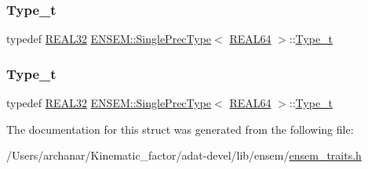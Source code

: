 \mbox{\label{structENSEM_1_1SinglePrecType_3_01REAL64_01_4_a931deb5906e330bffb27804fd850d061}} 
\subsubsection{\texorpdfstring{Type\_t}{Type\_t}\hspace{0.1cm}{\footnotesize\ttfamily [2/3]}}
{\footnotesize\ttfamily typedef \mbox{\hyperlink{namespaceENSEM_a7540d01191172323e9073283d772576d}{R\+E\+A\+L32}} \mbox{\hyperlink{structENSEM_1_1SinglePrecType}{E\+N\+S\+E\+M\+::\+Single\+Prec\+Type}}$<$ \mbox{\hyperlink{namespaceENSEM_a85b215b9f1f43715aebee01718e25082}{R\+E\+A\+L64}} $>$\+::\mbox{\hyperlink{structENSEM_1_1SinglePrecType_3_01REAL64_01_4_a931deb5906e330bffb27804fd850d061}{Type\+\_\+t}}}

\mbox{\label{structENSEM_1_1SinglePrecType_3_01REAL64_01_4_a931deb5906e330bffb27804fd850d061}} 
\subsubsection{\texorpdfstring{Type\_t}{Type\_t}\hspace{0.1cm}{\footnotesize\ttfamily [3/3]}}
{\footnotesize\ttfamily typedef \mbox{\hyperlink{namespaceENSEM_a7540d01191172323e9073283d772576d}{R\+E\+A\+L32}} \mbox{\hyperlink{structENSEM_1_1SinglePrecType}{E\+N\+S\+E\+M\+::\+Single\+Prec\+Type}}$<$ \mbox{\hyperlink{namespaceENSEM_a85b215b9f1f43715aebee01718e25082}{R\+E\+A\+L64}} $>$\+::\mbox{\hyperlink{structENSEM_1_1SinglePrecType_3_01REAL64_01_4_a931deb5906e330bffb27804fd850d061}{Type\+\_\+t}}}



The documentation for this struct was generated from the following file\+:\begin{DoxyCompactItemize}
\item 
/\+Users/archanar/\+Kinematic\+\_\+factor/adat-\/devel/lib/ensem/\mbox{\hyperlink{adat-devel_2lib_2ensem_2ensem__traits_8h}{ensem\+\_\+traits.\+h}}\end{DoxyCompactItemize}
